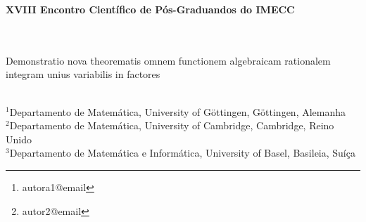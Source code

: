 \documentclass[a4paper, 12pt]{article}
\begin{document}
	\begin{center}
		\sc\large\textbf{XVIII Encontro Científico de Pós-Graduandos do IMECC}\\
		\vspace{-1em}
		\noindent \hrulefill\\	
		\vspace{-1.1em}
		\noindent \hrulefill\\
	\end{center}
	\begin{center}
		\Large{Demonstratio nova theorematis omnem functionem algebraicam rationalem integram unius variabilis in factores}
	\end{center}
	\author{
		{\large  Nome da Autora }\thanks{autora1@email}\\
		{\small Filiação da autora} \\
		{\large Nome do Autor }\thanks{autor2@email} \\
		{\small Filiação do autor } \\
	}
	
	\\
	{\footnotesize
	$^{1}$Departamento de Matemática, University of G\"{o}ttingen, G\"{o}ttingen, Alemanha\\ 
	$^{2}$Departamento de Matemática, University of Cambridge, Cambridge, Reino Unido\\
	$^{3}$Departamento de Matemática e Informática, University of Basel, Basileia, Suíça}
	\begin{abstract}
	\lipsum[1]
	
	:   %
	\end{abstract}
\end{document}
